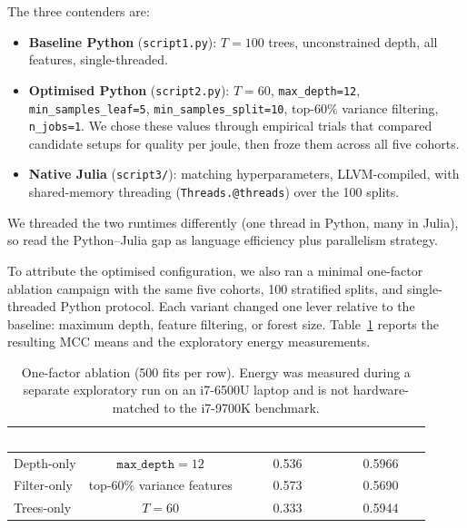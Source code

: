 \documentclass[11pt,a4paper]{article}
\newcommand{\code}[1]{\texttt{\small\color{primarydark}#1}}
\begin{document}
The three contenders are:
\begin{itemize}
\item \textbf{Baseline Python} (\code{script1.py}): $T{=}100$ trees, unconstrained depth, all features, single-threaded.
\item \textbf{Optimised Python} (\code{script2.py}): $T{=}60$, \code{max\_depth{=}12}, \code{min\_samples\_leaf{=}5}, \code{min\_samples\_split{=}10}, top-60\% variance filtering, \code{n\_jobs{=}1}. We chose these values through empirical trials that compared candidate setups for quality per joule, then froze them across all five cohorts.
\item \textbf{Native Julia} (\code{script3/}): matching hyperparameters, LLVM-compiled, with shared-memory threading (\code{Threads.@threads}) over the 100 splits.
\end{itemize}
We threaded the two runtimes differently (one thread in Python, many in Julia), so read the Python--Julia gap as language efficiency plus parallelism strategy.

To attribute the optimised configuration, we also ran a minimal one-factor
ablation campaign with the same five cohorts, 100 stratified splits, and
single-threaded Python protocol. Each variant changed one lever relative to
the baseline: maximum depth, feature filtering, or forest size. Table~\ref{tab:ablation}
reports the resulting MCC means and the exploratory energy measurements.

\begin{table}[H]
\centering
\footnotesize
\caption{One-factor ablation (500 fits per row). Energy was measured during a
separate exploratory run on an i7-6500U laptop and is not hardware-matched to
the i7-9700K benchmark.}
\label{tab:ablation}
\begin{tabularx}{\textwidth}{>{\raggedright\arraybackslash}X c c c}
\toprule
\rowcolor{primarydark}
\textcolor{white}{\textbf{Variant}} &
\textcolor{white}{\textbf{Changed lever}} &
\textcolor{white}{\textbf{Energy (Wh)}} &
\textcolor{white}{\textbf{Mean MCC}} \\
\midrule
Depth-only & $\texttt{max\_depth}=12$ & 0.536 & 0.5966 \\
Filter-only & top-60\% variance features & 0.573 & 0.5690 \\
Trees-only & $T=60$ & 0.333 & 0.5944 \\
\bottomrule
\end{tabularx}
\end{table}
\end{document}
